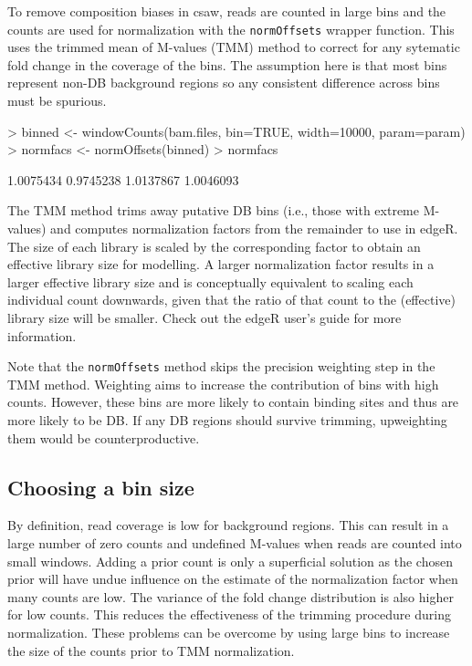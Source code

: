 \documentclass[12pt]{report}
\renewenvironment{Schunk}{\vspace{0pt}}{\vspace{0pt}}
\newcommand{\edger}{edgeR}
\newcommand{\pkgname}{csaw}
\newcommand{\code}[1]{{\small\texttt{#1}}}
\begin{document}
To remove composition biases in \pkgname{}, reads are counted in large bins and the counts are used for normalization with the \code{normOffsets} wrapper function.
This uses the trimmed mean of M-values (TMM) method \citep{oshlack2010} to correct for any sytematic fold change in the coverage of the bins. 
The assumption here is that most bins represent non-DB background regions so any consistent difference across bins must be spurious.

\begin{Schunk}
\begin{Sinput}
> binned <- windowCounts(bam.files, bin=TRUE, width=10000, param=param)
> normfacs <- normOffsets(binned)
> normfacs
\end{Sinput}
\begin{Soutput}
[1] 1.0075434 0.9745238 1.0137867 1.0046093
\end{Soutput}
\end{Schunk}

The TMM method trims away putative DB bins (i.e., those with extreme M-values) and computes normalization factors from the remainder to use in \edger{}. 
The size of each library is scaled by the corresponding factor to obtain an effective library size for modelling. 
A larger normalization factor results in a larger effective library size and is conceptually equivalent to scaling each individual count downwards, given that the ratio of that count to the (effective) library size will be smaller. 
Check out the \edger{} user's guide for more information.

Note that the \code{normOffsets} method skips the precision weighting step in the TMM method.
Weighting aims to increase the contribution of bins with high counts.
However, these bins are more likely to contain binding sites and thus are more likely to be DB. 
If any DB regions should survive trimming, upweighting them would be counterproductive. 


\subsection{Choosing a bin size}
By definition, read coverage is low for background regions. 
This can result in a large number of zero counts and undefined M-values when reads are counted into small windows. 
Adding a prior count is only a superficial solution as the chosen prior will have undue influence on the estimate of the normalization factor when many counts are low. 
The variance of the fold change distribution is also higher for low counts. 
This reduces the effectiveness of the trimming procedure during normalization. 
These problems can be overcome by using large bins to increase the size of the counts prior to TMM normalization. 
\end{document}
